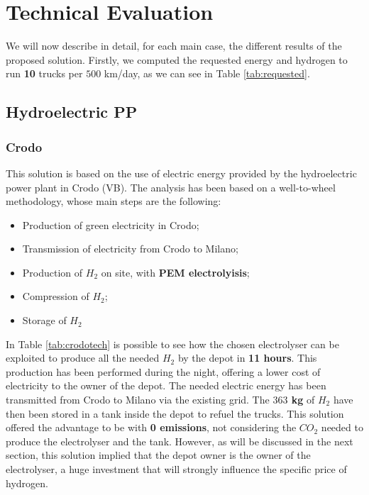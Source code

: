 \chapter{Technical Evaluation}
We will now describe in detail, for each main case, the different results of the proposed solution. Firstly, we computed the requested energy and hydrogen to run \textbf{10 }trucks per $500$ km/day, as we can see in Table \ref{tab:requested}.



\section{Hydroelectric PP}
\subsection{Crodo}
This solution is based on the use of electric energy provided by the hydroelectric power plant in Crodo (VB). The analysis has been based on a well-to-wheel methodology, whose main steps are the following:

\begin{itemize}
\item Production of green electricity in Crodo;
\item Transmission of electricity from Crodo to Milano;
\item Production of $H_2$ on site, with \textbf{PEM electrolyisis};
\item Compression of $H_2$;
\item Storage of $H_2$
\end{itemize}

In Table \ref{tab:crodotech} is possible to see how the chosen electrolyser can be exploited to produce all the needed $H_2$ by the depot in \textbf{11 hours}. This production has been performed during the night, offering a lower cost of electricity to the owner of the depot. The needed electric energy has been transmitted from Crodo to Milano via the existing grid. The \textbf{$363$ kg} of $H_2$ have then been stored in a tank inside the depot to refuel the trucks. This solution offered the advantage to be with \textbf{0 emissions}, not considering the $CO_2$ needed to produce the electrolyser and the tank. However, as will be discussed in the next section, this solution implied that the depot owner is the owner of the electrolyser, a huge investment that will strongly influence the specific price of hydrogen.

